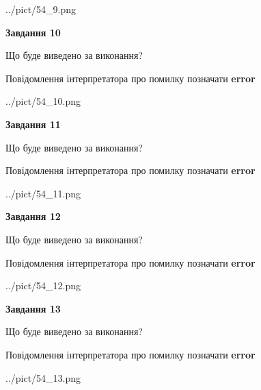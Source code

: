 \documentclass[11pt, ukrainian]{article}
\begin{document}
{\begin {large}
\begin{center}
	{../pict/54_9.png}
\end{center}
\newpage

{\begin {center}\textbf{Завдання 10}\end {center}}\par
Що буде виведено за виконання? \par
Повідомлення інтерпретатора про помилку позначати \textbf{error}

\begin{center}
	{../pict/54_10.png}
\end{center}
\newpage

{\begin {center}\textbf{Завдання 11}\end {center}}\par
Що буде виведено за виконання? \par
Повідомлення інтерпретатора про помилку позначати \textbf{error}

\begin{center}
	{../pict/54_11.png}
\end{center}
\newpage

{\begin {center}\textbf{Завдання 12}\end {center}}\par
Що буде виведено за виконання? \par
Повідомлення інтерпретатора про помилку позначати \textbf{error}

\begin{center}
	{../pict/54_12.png}
\end{center}
\newpage

{\begin {center}\textbf{Завдання 13}\end {center}}\par
Що буде виведено за виконання? \par
Повідомлення інтерпретатора про помилку позначати \textbf{error}

\begin{center}
	{../pict/54_13.png}
\end{center}
\newpage


\end{large}}
\end{document}
